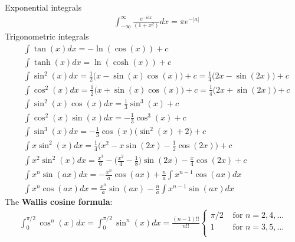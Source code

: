Exponential integrals
\begin{align}
	&\int_{-\infty}^{\infty} \frac{e^{-iax}}{(1+x^2)}dx = \pi e^{-|a|}
\end{align}
Trigonometric integrals 
\begin{align}
	&\int \tan(x)dx = -\ln(\cos(x)) +c\\
	&\int \tanh(x)dx = \ln(\cosh(x))+c \\
	&\int \sin^2(x)dx = \frac{1}{2}\big(x-\sin(x)\cos(x)\big)+c = \frac{1}{4}\big(2x-\sin(2x)\big)+c\\
	&\int \cos^2(x)dx = \frac{1}{2}\big(x+\sin(x)\cos(x)\big)+c = \frac{1}{4}\big(2x+\sin(2x)\big)+c \\
	&\int \sin^2(x)\cos(x)dx = \frac{1}{3}\sin^3(x)+c \\
	&\int \cos^2(x)\sin(x)dx = -\frac{1}{3}\cos^3(x)+c \\
	&\int \sin^3(x)dx = -\frac{1}{3}\cos(x)\big(\sin^2(x)+2\big)+c \\
	&\int x\sin^2(x)dx = \frac{1}{4}\big(x^2-x\sin(2x)-\frac{1}{2}\cos(2x)\big)+c\\
	&\int x^2\sin^2(x)dx =\frac{x^3}{6}-\bigg(\frac{x^2}{4}-\frac{1}{8}\bigg)\sin(2x)-\frac{x}{4}\cos(2x)+c \\
	&\int x^n \sin(ax)dx = -\frac{x^n}{a}\cos(ax)+ \frac{n}{a}\int x^{n-1}\cos(ax)dx \\
	&\int x^n \cos(ax)dx = \frac{x^n}{a}\sin(ax)- \frac{n}{a}\int x^{n-1}\sin(ax)dx		
\end{align}
The \textbf{Wallis cosine formula}:
\begin{align}
\int_{0}^{\pi/2}\cos^n(x) dx = \int_{0}^{\pi/2}\sin^n(x) dx = \frac{(n-1)!!}{n!!}
\begin{cases}
\pi/2 &\textrm{ for } n=2,4,\dots\\
1 &\textrm{ for } n=3,5,\dots\\
\end{cases}
\end{align}




\newpage
